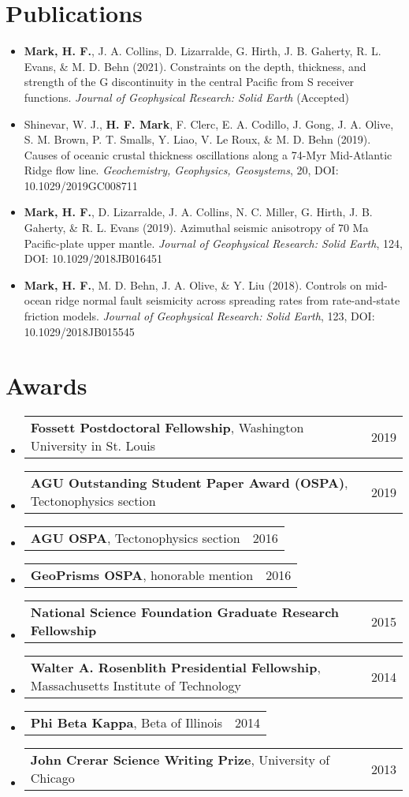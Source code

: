 \documentclass[letterpaper,11pt]{article}
\makeatletter
\newlength\listindent
\newcommand{\resumeCite}[6]{
  \vspace{-2pt}\item 
    #1 (#2). #3. \textit{#4}, #5, DOI: #6
  \vspace{-5pt}
}
\newcommand{\resumeManu}[4]{
  \vspace{-2pt}\item 
    #1 (#2). #3. #4
  \vspace{-5pt}
}
\newcommand{\resumeSmallThing}[3]{
  \vspace{-2pt}\item
    \begin{tabular*}{0.97\textwidth}[t]{l@{\extracolsep{\fill}}r}
      \textbf{#1}, {#2} & #3\\
    \end{tabular*}\vspace{-14pt}
}
\newcommand{\resumeSmallerThing}[2]{
  \vspace{-2pt}\item
    \begin{tabular*}{0.97\textwidth}[t]{l@{\extracolsep{\fill}}r}
      \textbf{#1} & #2\\
    \end{tabular*}\vspace{-14pt}
}
\newcommand{\resumeSubHeadingListStart}{\begin{itemize}[leftmargin=0.15in, label={}]}
\newcommand{\resumeSubHeadingListEnd}{\end{itemize}}
\makeatother
\begin{document}
\section{Publications}
    \resumeSubHeadingListStart
     0cm \linewidth \listindent \dimexpr\linewidth-\listindent\relax
    \resumeManu
    {\textbf{Mark, H. F.}, J. A. Collins, D. Lizarralde, G. Hirth, J. B. Gaherty, R. L. Evans, \& M. D. Behn}{2021}{Constraints on the depth, thickness, and strength of the G discontinuity in the central Pacific from S receiver functions}{\textit{Journal of Geophysical Research: Solid Earth} (Accepted)}
    \resumeCite
    {Shinevar, W. J., \textbf{H. F. Mark}, F. Clerc, E. A. Codillo, J. Gong, J. A. Olive, S. M. Brown, P. T. Smalls, Y. Liao, V. Le Roux, \& M. D. Behn}{2019}{Causes of oceanic crustal thickness oscillations along a 74-Myr Mid-Atlantic Ridge flow line}{Geochemistry, Geophysics, Geosystems}{20}{10.1029/2019GC008711}
    \resumeCite
    {\textbf{Mark, H. F.}, D. Lizarralde, J. A. Collins, N. C. Miller, G. Hirth, J. B. Gaherty, \& R. L. Evans}{2019}{Azimuthal seismic anisotropy of 70 Ma Pacific-plate upper mantle}{Journal of Geophysical Research: Solid Earth}{124}{10.1029/2018JB016451}
    \resumeCite
    {\textbf{Mark, H. F.}, M. D. Behn, J. A. Olive, \& Y. Liu}{2018}{Controls on mid-ocean ridge normal fault seismicity across spreading rates from rate-and-state friction models}{Journal of Geophysical Research: Solid Earth}{123}{10.1029/2018JB015545}
    \resumeSubHeadingListEnd


\section{Awards}
    \resumeSubHeadingListStart
    \resumeSmallThing
      {Fossett Postdoctoral Fellowship}{Washington University in St. Louis}{2019}
    \resumeSmallThing
      {AGU Outstanding Student Paper Award (OSPA)}{Tectonophysics section}{2019}
    \resumeSmallThing
      {AGU OSPA}{Tectonophysics section}{2016}
    \resumeSmallThing
      {GeoPrisms OSPA}{honorable mention}{2016}
    \resumeSmallerThing
      {National Science Foundation Graduate Research Fellowship}{2015}
    \resumeSmallThing
      {Walter A. Rosenblith Presidential Fellowship}{Massachusetts Institute of Technology}{2014}
    \resumeSmallThing
      {Phi Beta Kappa}{Beta of Illinois}{2014}
    \resumeSmallThing
      {John Crerar Science Writing Prize}{University of Chicago}{2013}
    \resumeSubHeadingListEnd
\end{document}

